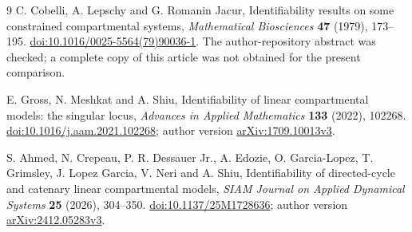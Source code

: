 \documentclass[11pt]{article}
\theoremstyle{remark}
\newcommand{\1}{\mathbf 1}
\begin{document}
\begin{thebibliography}{9}
C. Cobelli, A. Lepschy and G. Romanin Jacur,
Identifiability results on some constrained compartmental systems,
\emph{Mathematical Biosciences} \textbf{47} (1979), 173--195.
\href{https://doi.org/10.1016/0025-5564(79)90036-1}{doi:10.1016/0025-5564(79)90036-1}.
The author-repository abstract was checked; a complete copy of this article
was not obtained for the present comparison.

E. Gross, N. Meshkat and A. Shiu,
Identifiability of linear compartmental models: the singular locus,
\emph{Advances in Applied Mathematics} \textbf{133} (2022), 102268.
\href{https://doi.org/10.1016/j.aam.2021.102268}{doi:10.1016/j.aam.2021.102268};
author version \href{https://arxiv.org/abs/1709.10013v3}{arXiv:1709.10013v3}.

S. Ahmed, N. Crepeau, P. R. Dessauer Jr., A. Edozie, O. Garcia-Lopez,
T. Grimsley, J. Lopez Garcia, V. Neri and A. Shiu,
Identifiability of directed-cycle and catenary linear compartmental models,
\emph{SIAM Journal on Applied Dynamical Systems} \textbf{25} (2026), 304--350.
\href{https://doi.org/10.1137/25M1728636}{doi:10.1137/25M1728636};
author version \href{https://arxiv.org/html/2412.05283v3}{arXiv:2412.05283v3}.
\end{thebibliography}
\end{document}
